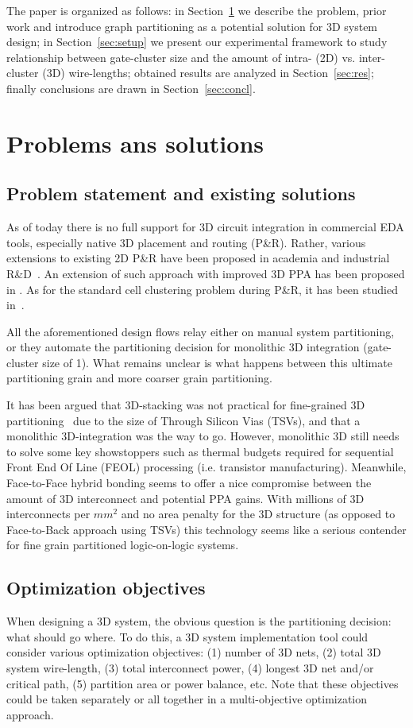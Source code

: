 \documentclass[conference]{IEEEtran}
\begin{document}
The paper is organized as follows: in Section~\ref{sec:optobj} we describe the problem, prior work and introduce graph partitioning as a potential solution for 3D system design; in Section~\ref{sec:setup} we present our experimental framework to study relationship between gate-cluster size and the amount of intra- (2D) vs. inter-cluster (3D) wire-lengths; obtained results are analyzed in Section~\ref{sec:res}; finally conclusions are drawn in Section~\ref{sec:concl}.

\section{Problems ans solutions}\label{sec:optobj}
\subsection{Problem statement and existing solutions}
As of today there is no full support for 3D circuit integration in commercial EDA tools, especially native 3D placement and routing (P\&R). Rather, various extensions to existing 2D P\&R have been proposed in academia and industrial R\&D~\cite{Panth}. An extension of such approach with improved 3D PPA has been proposed in \cite{Chang2016}. As for the standard cell clustering problem during P\&R, it has been studied in~\cite{Moura2017}. 

All the aforementioned design flows relay either on manual system partitioning, or they automate the partitioning decision for monolithic 3D integration (gate-cluster size of 1). What remains unclear is what happens between this ultimate partitioning grain and more coarser grain partitioning.  

It has been argued that 3D-stacking was not practical for fine-grained 3D partitioning~\cite{Samal2017} due to the size of Through Silicon Vias (TSVs), and that a monolithic 3D-integration was the way to go. However, monolithic 3D still needs to solve some key showstoppers such as thermal budgets required for sequential Front End Of Line (FEOL) processing (i.e. transistor manufacturing). Meanwhile, Face-to-Face hybrid bonding seems to offer a nice compromise between the amount of 3D interconnect and potential PPA gains. With millions of 3D interconnects per $mm^2$ and no area penalty for the 3D structure (as opposed to Face-to-Back approach using TSVs) this technology seems like a serious contender for fine grain partitioned logic-on-logic systems.

\subsection{Optimization objectives}
When designing a 3D system, the obvious question is the partitioning decision: what should go where. To do this, a 3D system implementation tool could consider various optimization objectives: (1) number of 3D nets, (2) total 3D system wire-length, (3) total interconnect power, (4) longest 3D net and/or critical path, (5) partition area or power balance, etc. Note that these objectives could be taken separately or all together in a multi-objective optimization approach.
\end{document}
